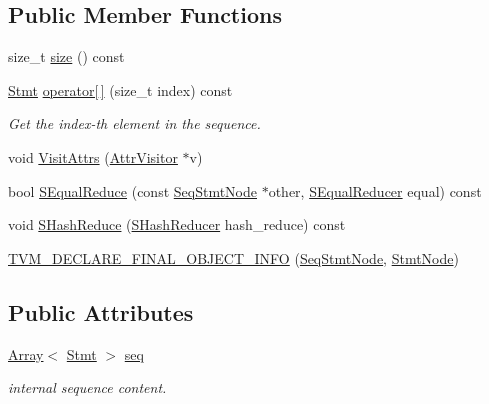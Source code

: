 \subsection*{Public Member Functions}
\begin{DoxyCompactItemize}
\item 
size\+\_\+t \hyperlink{classtvm_1_1tir_1_1SeqStmtNode_a1d34eff166fce8592b2791c21d0c4bc6}{size} () const 
\item 
\hyperlink{classtvm_1_1tir_1_1Stmt}{Stmt} \hyperlink{classtvm_1_1tir_1_1SeqStmtNode_abb4a377829c6f0449fb371ec2b792871}{operator\mbox{[}$\,$\mbox{]}} (size\+\_\+t index) const 
\begin{DoxyCompactList}\small\item\em Get the index-\/th element in the sequence. \end{DoxyCompactList}\item 
void \hyperlink{classtvm_1_1tir_1_1SeqStmtNode_a3196bba617d63bab596f363ae1f932d1}{Visit\+Attrs} (\hyperlink{classtvm_1_1AttrVisitor}{Attr\+Visitor} $\ast$v)
\item 
bool \hyperlink{classtvm_1_1tir_1_1SeqStmtNode_a6605000a8a3a89119ed3e7a2d91018f5}{S\+Equal\+Reduce} (const \hyperlink{classtvm_1_1tir_1_1SeqStmtNode}{Seq\+Stmt\+Node} $\ast$other, \hyperlink{classtvm_1_1SEqualReducer}{S\+Equal\+Reducer} equal) const 
\item 
void \hyperlink{classtvm_1_1tir_1_1SeqStmtNode_a4d1cdb3460cdc5c939ea08ff7f8dbe2a}{S\+Hash\+Reduce} (\hyperlink{classtvm_1_1SHashReducer}{S\+Hash\+Reducer} hash\+\_\+reduce) const 
\item 
\hyperlink{classtvm_1_1tir_1_1SeqStmtNode_a923520ad002fb629fb51a419771cc9e6}{T\+V\+M\+\_\+\+D\+E\+C\+L\+A\+R\+E\+\_\+\+F\+I\+N\+A\+L\+\_\+\+O\+B\+J\+E\+C\+T\+\_\+\+I\+N\+FO} (\hyperlink{classtvm_1_1tir_1_1SeqStmtNode}{Seq\+Stmt\+Node}, \hyperlink{classtvm_1_1tir_1_1StmtNode}{Stmt\+Node})
\end{DoxyCompactItemize}
\subsection*{Public Attributes}
\begin{DoxyCompactItemize}
\item 
\hyperlink{classtvm_1_1Array}{Array}$<$ \hyperlink{classtvm_1_1tir_1_1Stmt}{Stmt} $>$ \hyperlink{classtvm_1_1tir_1_1SeqStmtNode_a0e548955529d35c56e646fcaac38f865}{seq}
\begin{DoxyCompactList}\small\item\em internal sequence content. \end{DoxyCompactList}\end{DoxyCompactItemize}
